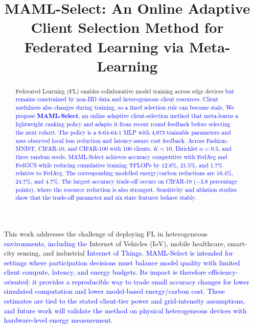 \documentclass[journal]{IEEEtran}
\newcommand{\revision}[1]{\textcolor{blue}{#1}}
\begin{document}
\title{MAML-Select: An Online Adaptive Client Selection Method for Federated Learning via Meta-Learning}


\maketitle

\begin{abstract}
Federated Learning (FL) enables collaborative model training across edge devices\revision{ but remains constrained by non-IID data and heterogeneous client resources. Client usefulness also changes during training, so a fixed selection rule can become stale. We propose \textbf{MAML-Select}, an online adaptive client-selection method that meta-learns a lightweight ranking policy and adapts it from recent round feedback before selecting the next cohort. The policy is a $6$-$64$-$64$-$1$ MLP with 4,673 trainable parameters and uses observed local loss reduction and latency-aware cost feedback. Across Fashion-MNIST, CIFAR-10, and CIFAR-100 with 100 clients, $K=10$, Dirichlet $\alpha=0.5$, and three random seeds, MAML-Select achieves accuracy competitive with FedAvg and FedGCS while reducing cumulative training TFLOPs by $12.8\%$, $21.5\%$, and $1.7\%$ relative to FedAvg. The corresponding modelled energy/carbon reductions are $16.4\%$, $24.7\%$, and $4.7\%$. The largest accuracy trade-off occurs on CIFAR-10 ($-3.8$ percentage points), where the resource reduction is also strongest. Sensitivity and ablation studies show that the trade-off parameter and six state features behave stably.}
\end{abstract}
\renewcommand\IEEEkeywordsname{Impact Statement}
\begin{IEEEkeywords}
This work addresses the challenge of deploying FL in heterogeneous \revision{environments, including the} Internet of Vehicles (IoV), mobile healthcare, smart-city sensing, and industrial \revision{Internet of Things}. \revision{MAML-Select is intended for settings where participation decisions must balance model quality with limited client compute, latency, and energy budgets. Its impact is therefore efficiency-oriented: it provides a reproducible way to trade small accuracy changes for lower simulated computation and lower model-based energy/carbon cost. These estimates are tied to the stated client-tier power and grid-intensity assumptions, and future work will validate the method on physical heterogeneous devices with hardware-level energy measurement.}


\end{IEEEkeywords}
\end{document}
